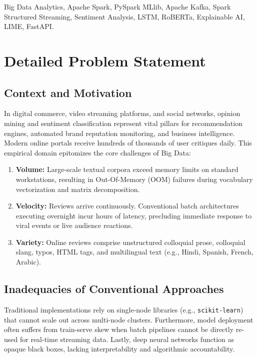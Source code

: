 \documentclass[conference]{IEEEtran}
\begin{document}
\begin{IEEEkeywords}
Big Data Analytics, Apache Spark, PySpark MLlib, Apache Kafka, Spark Structured Streaming, Sentiment Analysis, LSTM, RoBERTa, Explainable AI, LIME, FastAPI.
\end{IEEEkeywords}

\section{Detailed Problem Statement}
\subsection{Context and Motivation}
In digital commerce, video streaming platforms, and social networks, opinion mining and sentiment classification represent vital pillars for recommendation engines, automated brand reputation monitoring, and business intelligence. Modern online portals receive hundreds of thousands of user critiques daily. This empirical domain epitomizes the core challenges of Big Data:
\begin{enumerate}
    \item \textbf{Volume:} Large-scale textual corpora exceed memory limits on standard workstations, resulting in Out-Of-Memory (OOM) failures during vocabulary vectorization and matrix decomposition.
    \item \textbf{Velocity:} Reviews arrive continuously. Conventional batch architectures executing overnight incur hours of latency, precluding immediate response to viral events or live audience reactions.
    \item \textbf{Variety:} Online reviews comprise unstructured colloquial prose, colloquial slang, typos, HTML tags, and multilingual text (e.g., Hindi, Spanish, French, Arabic).
\end{enumerate}

\subsection{Inadequacies of Conventional Approaches}
Traditional implementations rely on single-node libraries (e.g., \texttt{scikit-learn}) that cannot scale out across multi-node clusters. Furthermore, model deployment often suffers from train-serve skew when batch pipelines cannot be directly re-used for real-time streaming data. Lastly, deep neural networks function as opaque black boxes, lacking interpretability and algorithmic accountability.
\end{document}
